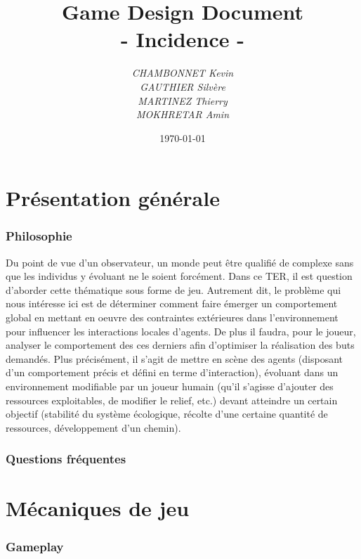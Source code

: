 \documentclass[a4paper]{article}
\title{\textbf{Game Design Document}\\- \Huge{Incidence} -}
\author{\emph{CHAMBONNET Kevin}\\\emph{GAUTHIER Silvère}\\\emph{MARTINEZ Thierry}\\\emph{MOKHRETAR Amin}}
\date{\today}
\begin{document}
  \maketitle
  \newpage
  \tableofcontents


  \newpage
  \part{Présentation générale}
    \section{Philosophie}

      Du point de vue d’un observateur, un monde peut être qualifié de complexe sans que les individus y évoluant ne le soient forcément. Dans ce TER, il est question d’aborder cette thématique sous forme de jeu. Autrement dit, le problème qui nous intéresse ici est de déterminer comment faire émerger un comportement global en mettant en oeuvre des contraintes extérieures dans l’environnement pour influencer les interactions locales d’agents. De plus il faudra, pour le joueur, analyser le comportement des ces derniers afin d’optimiser la réalisation des buts demandés. Plus précisément, il s’agit de mettre en scène des agents (disposant d’un comportement précis et défini en terme d’interaction), évoluant dans un environnement modifiable par un joueur humain (qu’il s’agisse d’ajouter des ressources exploitables, de modifier le relief, etc.) devant atteindre un certain objectif (stabilité du système écologique, récolte d’une certaine quantité de ressources, développement d’un chemin).

    \section{Questions fréquentes}


  \newpage
  \part{Mécaniques de jeu}
    \section{Gameplay}
\end{document}
